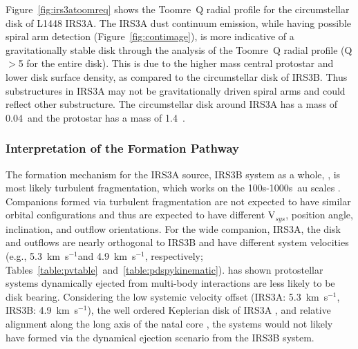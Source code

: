 \documentclass[twocolumn, 12pt, trackchanges]{aastex63}
\begin{document}
Figure~\ref{fig:irs3atoomreq} shows the Toomre~Q radial profile for the circumstellar disk of L1448 IRS3A. The IRS3A dust continuum emission, while having possible spiral arm detection (Figure~\ref{fig:contimage}), is more indicative of a gravitationally stable disk through the analysis of the Toomre~Q radial profile (Q$>$5 for the entire disk). This is due to the higher mass central protostar and lower disk surface density, as compared to the circumstellar disk of IRS3B. Thus substructures in IRS3A may not be gravitationally driven spiral arms and could reflect other substructure. The circumstellar disk around IRS3A has a mass of 0.04~\solm\space and the protostar has a mass of 1.4~\solm.


\subsubsection{Interpretation of the Formation Pathway}
The formation mechanism for the IRS3A source, IRS3B system as a whole, , is most likely turbulent fragmentation, which works on the 100s-1000s~au scales \citep[][]{2010ApJ...725.1485O, 2019ApJ...887..232L}. Companions formed via turbulent fragmentation are not expected to have similar orbital configurations and thus are expected to have different V$_{sys}$, position angle, inclination, and outflow orientations. For the wide companion, IRS3A, the disk and outflows are nearly orthogonal to IRS3B and have different system velocities (e.g., 5.3~km~s$^{-1}$\space and 4.9~km~s$^{-1}$, respectively; Tables~\ref{table:pvtable}~and~\ref{table:pdspykinematic}). \citet{2019ApJ...884....6M} has shown protostellar systems dynamically ejected from multi-body interactions are less likely to be disk bearing. Considering the low systemic velocity offset (IRS3A: 5.3~km~s$^{-1}$, IRS3B: 4.9~km~s$^{-1}$), the well ordered Keplerian disk of IRS3A \citep[][]{2012Natur.492..221R}, and relative alignment along the long axis of the natal core \citep{2017MNRAS.469.3881S}, the systems would not likely have formed via the dynamical ejection scenario from the IRS3B system.
\end{document}
